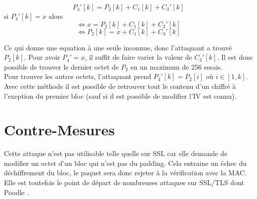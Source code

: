 \[P_4'[k] = P_2[k] + C_1[k] + C_3'[k]\] si $P_4'[k] = x$ alors
\[\Longleftrightarrow x = P_2[k] + C_1[k] + C_3'[k]\]
\[\Longleftrightarrow P_2[k] = x + C_1[k] + C_3'[k]\]

Ce qui donne une equation à une seule inconnue, donc l'attaquant a trouvé $P_2[k]$.
Pour avoir $P_4' = x$, il suffit de faire varier la valeur de $C_3'[k]$. Il est donc
possible de trouver le dernier octet de $P_2$ en un maximum de 256 essais.\\

Pour trouver les autres octets, l'attaquant prend $P_4'[k] = P_2[i]$ où $i \in [1,k]$.
Avec cette méthode il est possible de retrouver tout le contenu d'un chiffré à
l'exeption du premier bloc (sauf si il est possible de modifier l'IV est connu).\\

\section{Contre-Mesures}
\label{sec:cmPOA}

Cette attaque n'est pas utilisable telle quelle sur SSL car elle demande de modifier un octet
d'un bloc qui n'est pas du padding. Cela entraine un échec du déchiffrement du bloc, le
paquet sera donc rejeter à la vérification avec la MAC. Elle est toutefois le point de
départ de nombreuses attaques sur SSL/TLS dont Poodle\up{\ref{part:poodle}}
.
